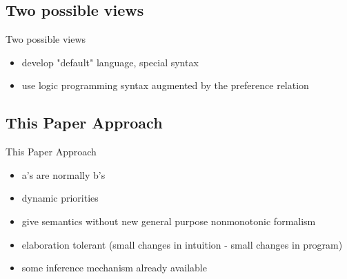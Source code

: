 \documentclass{beamer}
\begin{document}
\subsection[Approaches]{Two possible views}

\begin{frame}{Two possible views}
\begin{itemize}
  \item develop "default" language, special syntax
  \item use logic programming syntax 
     augmented by the preference relation
\end{itemize}

\end{frame}


\subsection[Approach]{This Paper Approach}

\begin{frame}{This Paper Approach}
\begin{itemize}
  \item a's are normally b's
  \item dynamic priorities
  \item give semantics without new general purpose nonmonotonic formalism
  \item elaboration tolerant (small changes in intuition - small changes in program)
  \item some inference mechanism already available
\end{itemize}
\end{frame}
\end{document}
